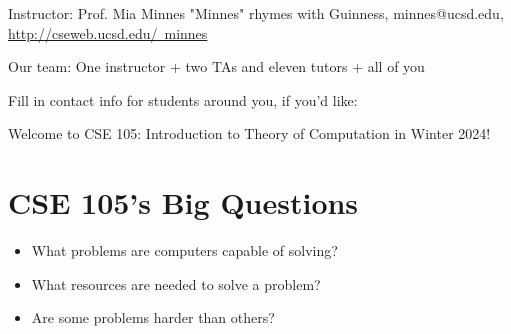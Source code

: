 Instructor: Prof. Mia Minnes {\tiny{"Minnes" rhymes with Guinness}}, minnes@ucsd.edu, 
\href{http://cseweb.ucsd.edu/~minnes}{http://cseweb.ucsd.edu/~minnes}


Our team: One instructor + two TAs and eleven tutors + all of you

Fill in contact info for students around you, if you'd like:

\vfill

\begin{comment}
On a typical week: {\bf MWF} Lectures + review quizzes, {\bf Tu} Homework due, {\bf WF} Discussion.
Office hours (hosted by instructors and TAs and tutors, where you can come to talk 
about course concepts and ask for help as you work through sample problems) and Q+A on Piazza available throughout the week.
All dates are on \href{https://canvas.ucsd.edu/}{Canvas (click for link)} and details are on
 \href{https://canvas.ucsd.edu/courses/51649/}{the Syllabus page}.


There are lots of great reasons to have a laptop, tablet, or phone open during class. You might be taking notes, 
getting a photo of an important moment on the board, trying out a construction that we're developing together, working 
on the review quiz, and so on. 
The main issue with screens and technology in the classroom isn't your own distraction (which is your responsibility to manage), 
it's the distraction of other students. Anyone sitting behind you cannot help but have your screen in their field of view. 
Having distracting content on your screen can really harm their learning experience.

With this in mind, the device policy for the course is that if you have a screen open, you either:

Have only content onscreen that's directly related to the current lecture.
Have unrelated content open and sit in one of the back two rows of the room to mitigate the effects on other students. 
\end{comment}
\vfill

\newpage 
Welcome to CSE 105: Introduction to Theory of Computation in Winter 2024!

\section*{CSE 105's Big Questions}
\begin{itemize}
   \item What problems are computers capable of solving?
   \item What resources are needed to solve a problem?
   \item Are some problems harder than others?
\end{itemize}

